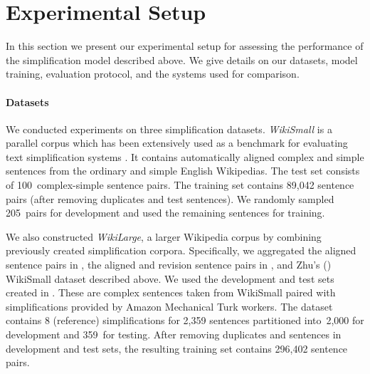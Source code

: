 \documentclass[11pt,letterpaper]{article}
\begin{document}
\section{Experimental Setup}
\label{sec:experimental-setup}

In this section we present our experimental setup for assessing the
performance of the simplification model described above. We give
details on our datasets, model training,  evaluation
protocol, and the systems used for comparison. 







\paragraph{Datasets}
\label{sec:dataset}

We conducted experiments on three simplification datasets.
\textit{WikiSmall} \cite{zhu2010monolingual} is a parallel corpus
which has been extensively used as a benchmark for evaluating text
simplification systems
\cite{wubben2012sentence,woodsend-lapata:2011:EMNLP,narayan-gardent:2014,zhu2010monolingual}. It
contains automatically aligned complex and simple sentences from the
ordinary and simple English Wikipedias. The test set consists of
100~complex-simple sentence pairs. The training set contains 89,042
sentence pairs (after removing duplicates and test sentences).  We
randomly sampled 205~pairs for development and used the
remaining sentences for training.  

We also constructed \textit{WikiLarge}, a larger Wikipedia corpus by
combining previously created simplification corpora. Specifically, we
aggregated the aligned sentence pairs in
, the aligned and revision sentence
pairs in , and Zhu's
(\citeyear{zhu2010monolingual}) WikiSmall dataset described above. We
used the development and test sets created in
. These are complex sentences taken from WikiSmall
paired with simplifications provided by Amazon Mechanical Turk
workers. The dataset contains 8 (reference) simplifications for 2,359
sentences partitioned into~2,000 for development and 359~for
testing. After removing duplicates and sentences in development and
test sets, the resulting training set contains 296,402 sentence pairs.
\end{document}
